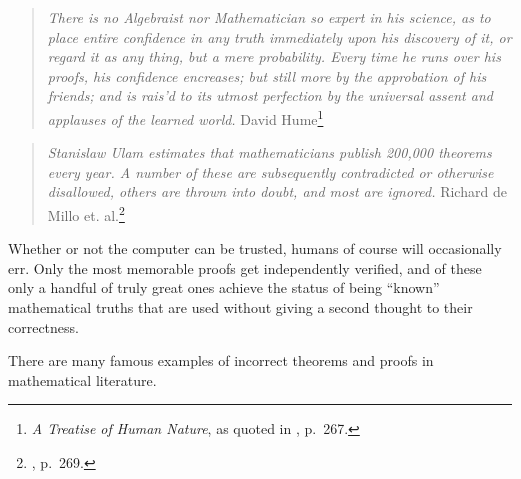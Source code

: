 \begin{quote}
  {\em There is no Algebraist nor Mathematician so expert in his science, as
  to place entire confidence in any truth immediately upon his discovery of it,
  or regard it as any thing, but a mere probability.  Every time he runs over
  his proofs, his confidence encreases; but still more by the approbation of
  his friends; and is rais'd to its utmost perfection by the universal assent
  and applauses of the learned world.}
  \flushright\sc David Hume\footnote{{\em A Treatise of Human Nature}, as
  quoted in \cite{deMillo}, p.~267.}\\
\end{quote}

\begin{quote}
  {\em Stanislaw Ulam estimates that mathematicians publish 200,000 theorems
  every year.  A number of these are subsequently contradicted or otherwise
  disallowed, others are thrown into doubt, and most are ignored.}
  \flushright\sc Richard de Millo et. al.\footnote{\cite{deMillo}, p.~269.}\\
\end{quote}

Whether or not the computer can be trusted, humans  of course will occasionally
err. Only the most memorable proofs get independently verified, and of these
only a handful of truly great ones achieve the status of being ``known''
mathematical truths that are used without giving a second thought to their
correctness.

There are many famous examples of incorrect theorems and proofs in
mathematical literature.

